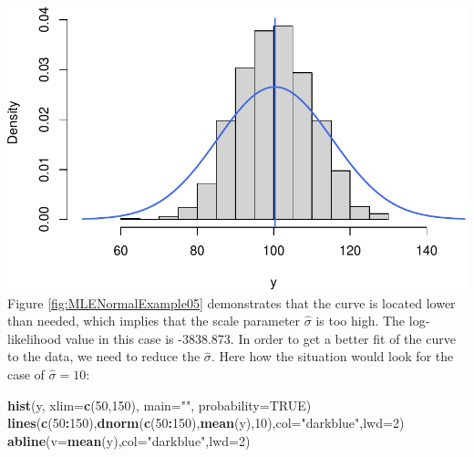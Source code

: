 \documentclass[
]{book}
\newenvironment{Shaded}{\begin{snugshade}}{\end{snugshade}}
\newcommand{\AttributeTok}[1]{\textcolor[rgb]{0.13,0.29,0.53}{#1}}
\newcommand{\ConstantTok}[1]{\textcolor[rgb]{0.56,0.35,0.01}{#1}}
\newcommand{\DecValTok}[1]{\textcolor[rgb]{0.00,0.00,0.81}{#1}}
\newcommand{\FunctionTok}[1]{\textcolor[rgb]{0.13,0.29,0.53}{\textbf{#1}}}
\newcommand{\NormalTok}[1]{#1}
\newcommand{\SpecialCharTok}[1]{\textcolor[rgb]{0.81,0.36,0.00}{\textbf{#1}}}
\newcommand{\StringTok}[1]{\textcolor[rgb]{0.31,0.60,0.02}{#1}}
\theoremstyle{definition}
\theoremstyle{definition}
\theoremstyle{definition}
\theoremstyle{definition}
\theoremstyle{remark}
\begin{document}
\includegraphics{Svetunkov---Statistics-for-Business-Analytics_files/figure-latex/MLENormalExample05-1.pdf}
Figure \ref{fig:MLENormalExample05} demonstrates that the curve is located lower than needed, which implies that the scale parameter \(\hat{\sigma}\) is too high. The log-likelihood value in this case is -3838.873. In order to get a better fit of the curve to the data, we need to reduce the \(\hat{\sigma}\). Here how the situation would look for the case of \(\hat{\sigma}=10\):

\begin{Shaded}
\begin{Highlighting}[]
\FunctionTok{hist}\NormalTok{(y, }\AttributeTok{xlim=}\FunctionTok{c}\NormalTok{(}\DecValTok{50}\NormalTok{,}\DecValTok{150}\NormalTok{), }\AttributeTok{main=}\StringTok{""}\NormalTok{, }\AttributeTok{probability=}\ConstantTok{TRUE}\NormalTok{)}
\FunctionTok{lines}\NormalTok{(}\FunctionTok{c}\NormalTok{(}\DecValTok{50}\SpecialCharTok{:}\DecValTok{150}\NormalTok{),}\FunctionTok{dnorm}\NormalTok{(}\FunctionTok{c}\NormalTok{(}\DecValTok{50}\SpecialCharTok{:}\DecValTok{150}\NormalTok{),}\FunctionTok{mean}\NormalTok{(y),}\DecValTok{10}\NormalTok{),}\AttributeTok{col=}\StringTok{"darkblue"}\NormalTok{,}\AttributeTok{lwd=}\DecValTok{2}\NormalTok{)}
\FunctionTok{abline}\NormalTok{(}\AttributeTok{v=}\FunctionTok{mean}\NormalTok{(y),}\AttributeTok{col=}\StringTok{"darkblue"}\NormalTok{,}\AttributeTok{lwd=}\DecValTok{2}\NormalTok{)}
\end{Highlighting}
\end{Shaded}
\end{document}
